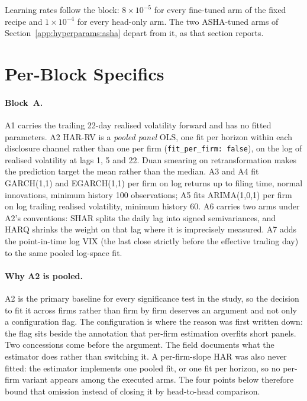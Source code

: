 Learning rates follow the block: $8\times10^{-5}$ for every fine-tuned arm of
the fixed recipe and $1\times10^{-4}$ for every head-only arm. The two
ASHA-tuned arms of Section~\ref{app:hyperparams:asha} depart from it, as that
section reports. %

\FloatBarrier
\section{Per-Block Specifics}
\label{app:hyperparams:blocks}

\paragraph{Block~A.} A1 carries the trailing 22-day realised volatility forward
and has no fitted parameters. A2 HAR-RV is a \emph{pooled panel} OLS, one fit per
horizon within each disclosure channel rather than one per firm
(\texttt{fit\_per\_firm: false}), on the log of
realised volatility at lags 1, 5 and 22. Duan smearing on retransformation
makes the prediction target the mean rather than the median. %
A3 and A4 fit GARCH(1,1) and EGARCH(1,1) per firm on log returns up to filing
time, normal innovations, minimum history 100 observations; A5 fits ARIMA(1,0,1)
per firm on log trailing realised volatility, minimum history 60. %
A6 carries two arms under A2's conventions: SHAR splits the daily lag into
signed semivariances, and HARQ shrinks the weight on that lag where it is
imprecisely measured. A7
adds the point-in-time log VIX (the last close strictly before the effective
trading day) to the same pooled log-space fit. %

\paragraph{Why A2 is pooled.} A2 is the primary baseline for every significance
test in the study, so the decision to fit it across firms rather than firm by firm
deserves an argument and not only a configuration flag. The configuration is where
the reason was first written down: the flag sits beside the annotation that
per-firm estimation overfits short panels. %
Two concessions come before the argument. The field documents what the estimator
does rather than switching it. A per-firm-slope HAR was also never fitted: the
estimator implements one pooled fit, or one fit per horizon, so no per-firm
variant appears among the executed arms. %
The four points below therefore bound that omission instead of closing it by
head-to-head comparison.

